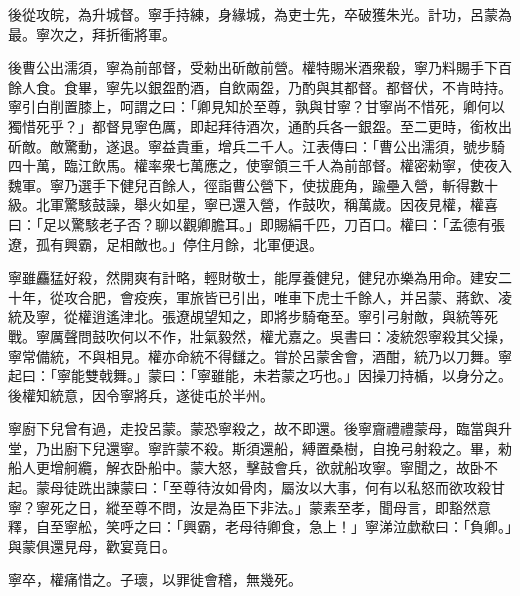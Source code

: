 \begin{pinyinscope}
後從攻皖，為升城督。寧手持練，身緣城，為吏士先，卒破獲朱光。計功，呂蒙為最。寧次之，拜折衝將軍。

後曹公出濡須，寧為前部督，受勑出斫敵前營。權特賜米酒衆殽，寧乃料賜手下百餘人食。食畢，寧先以銀盌酌酒，自飲兩盌，乃酌與其都督。都督伏，不肯時持。寧引白削置膝上，呵謂之曰：「卿見知於至尊，孰與甘寧？甘寧尚不惜死，卿何以獨惜死乎？」都督見寧色厲，即起拜待酒次，通酌兵各一銀盌。至二更時，銜枚出斫敵。敵驚動，遂退。寧益貴重，增兵二千人。江表傳曰：「曹公出濡須，號步騎四十萬，臨江飲馬。權率衆七萬應之，使寧領三千人為前部督。權密勑寧，使夜入魏軍。寧乃選手下健兒百餘人，徑詣曹公營下，使拔鹿角，踰壘入營，斬得數十級。北軍驚駭鼓譟，舉火如星，寧已還入營，作鼓吹，稱萬歲。因夜見權，權喜曰：「足以驚駭老子否？聊以觀卿膽耳。」即賜絹千匹，刀百口。權曰：「孟德有張遼，孤有興霸，足相敵也。」停住月餘，北軍便退。

寧雖麤猛好殺，然開爽有計略，輕財敬士，能厚養健兒，健兒亦樂為用命。建安二十年，從攻合肥，會疫疾，軍旅皆已引出，唯車下虎士千餘人，并呂蒙、蔣欽、凌統及寧，從權逍遙津北。張遼覘望知之，即將步騎奄至。寧引弓射敵，與統等死戰。寧厲聲問鼓吹何以不作，壯氣毅然，權尤嘉之。吳書曰：凌統怨寧殺其父操，寧常備統，不與相見。權亦命統不得讎之。甞於呂蒙舍會，酒酣，統乃以刀舞。寧起曰：「寧能雙戟舞。」蒙曰：「寧雖能，未若蒙之巧也。」因操刀持楯，以身分之。後權知統意，因令寧將兵，遂徙屯於半州。

寧廚下兒曾有過，走投呂蒙。蒙恐寧殺之，故不即還。後寧齎禮禮蒙母，臨當與升堂，乃出廚下兒還寧。寧許蒙不殺。斯須還船，縛置桑樹，自挽弓射殺之。畢，勑船人更增舸纜，解衣卧船中。蒙大怒，擊鼓會兵，欲就船攻寧。寧聞之，故卧不起。蒙母徒跣出諫蒙曰：「至尊待汝如骨肉，屬汝以大事，何有以私怒而欲攻殺甘寧？寧死之日，縱至尊不問，汝是為臣下非法。」蒙素至孝，聞母言，即豁然意釋，自至寧舩，笑呼之曰：「興霸，老母待卿食，急上！」寧涕泣歔欷曰：「負卿。」與蒙俱還見母，歡宴竟日。

寧卒，權痛惜之。子瓌，以罪徙會稽，無幾死。


\end{pinyinscope}